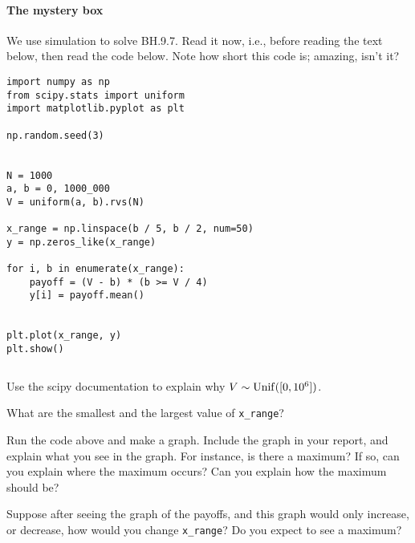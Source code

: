 \documentclass[assignments]{subfiles}
\begin{document}
\paragraph{The mystery box}

We use  simulation to solve  BH.9.7.
Read it now, i.e., before reading the text below, then read the code below.
Note how short  this code is;  amazing, isn't it?



\begin{verbatim}
import numpy as np
from scipy.stats import uniform
import matplotlib.pyplot as plt

np.random.seed(3)


N = 1000
a, b = 0, 1000_000
V = uniform(a, b).rvs(N)

x_range = np.linspace(b / 5, b / 2, num=50)
y = np.zeros_like(x_range)

for i, b in enumerate(x_range):
    payoff = (V - b) * (b >= V / 4)
    y[i] = payoff.mean()


plt.plot(x_range, y)
plt.show()
\end{verbatim}


\begin{verbatim}

\end{verbatim}


\begin{exercise}
Use the scipy documentation to explain why $V\sim\mathrm{Unif}([0,10^{6}])$.
\begin{solution}
\end{solution}
\end{exercise}



\begin{exercise}
What are the smallest and the largest value of \verb|x_range|?
\begin{solution}
\end{solution}
\end{exercise}

\begin{exercise}
Run the code above and make a graph. Include the graph in your report, and explain what you see in the graph. For instance, is there a maximum? If so, can you explain where the maximum occurs? Can you explain how the maximum should be?
\begin{solution}
\end{solution}
\end{exercise}


\begin{exercise}
Suppose after seeing the graph of the payoffs, and this graph would only increase, or decrease, how would you change \verb|x_range|? Do you expect to see a maximum?
\begin{solution}
\end{solution}
\end{exercise}
\end{document}
